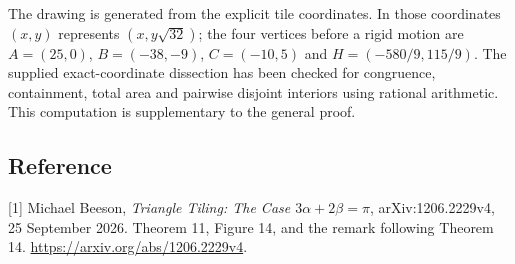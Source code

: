\documentclass[10pt,a4paper]{article}
\begin{document}
\smallskip
\noindent\small The drawing is generated from the explicit tile coordinates.
In those coordinates $(x,y)$ represents $(x,y\sqrt{32})$; the four vertices
before a rigid motion are
$A=(25,0)$, $B=(-38,-9)$, $C=(-10,5)$ and
$H=(-580/9,115/9)$. The supplied exact-coordinate dissection has been checked
for congruence, containment, total area and pairwise disjoint interiors using
rational arithmetic. This computation is supplementary to the general proof.
\normalsize

\subsection*{Reference}
\small [1] Michael Beeson, \textit{Triangle Tiling: The Case $3\alpha+2\beta=\pi$},
arXiv:1206.2229v4, 25 September 2026. Theorem 11, Figure 14, and the remark
following Theorem 14. \url{https://arxiv.org/abs/1206.2229v4}.
\end{document}
